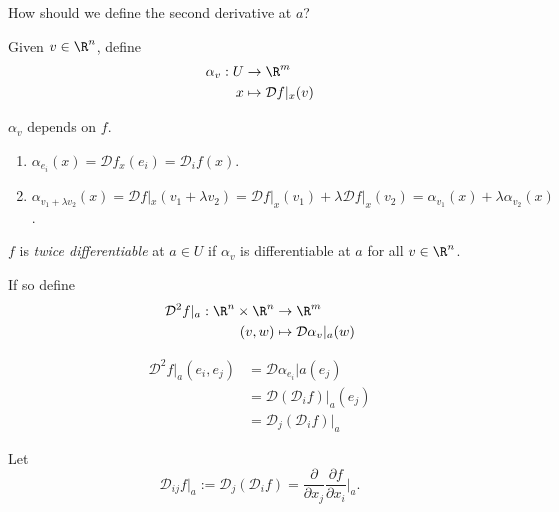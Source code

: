 \documentclass[a4paper]{article}
\newcommand*{\D}{\mathcal{D}}
\theoremstyle{definition}
\begin{document}
\begin{question}
  How should we define the second derivative at \(a\)?
\end{question}

Given \(v \in \R^n\), define
\begin{align*}
  \alpha_v: U &\to \R^m \\
  x &\mapsto \D f|_x(v)
\end{align*}

\begin{note}
  \(\alpha_v\) depends on \(f\).
\end{note}

\begin{eg}\leavevmode
  \begin{enumerate}
  \item \(\alpha_{e_i}(x) = \D f_{x}(e_i) =\D_i f(x)\).
  \item \(\alpha_{v_1 + \lambda v_2}(x) = \D f|_x(v_1 + \lambda v_2) = \D f|_x(v_1) + \lambda \D f|_x(v_2) = \alpha_{v_1}(x) + \lambda \alpha_{v_2}(x)\).
  \end{enumerate}
\end{eg}

\begin{definition}
  \(f\) is \emph{twice differentiable} at \(a \in U\) if \(\alpha_v\) is differentiable at \(a\) for all \(v \in \R^n\).

  If so define
  \begin{align*}
    \D^2 f|_a: \R^n \times \R^n &\to \R^m \\
    (v, w) &\mapsto \D \alpha_v|_a (w)
  \end{align*}
\end{definition}

\begin{eg}
  \begin{align*}
    \D^2 f|_a (e_i, e_j) &= \D \alpha_{e_i}|a (e_j) \\
                         &= \D (\D_i f)|_a (e_j) \\
                         &= \D_j (\D_i f)|_a
  \end{align*}
\end{eg}

\begin{notation}
  Let
  \[
    \D_{ij} f|_a := \D_j (\D_i f) = \frac{\partial}{\partial x_j} \frac{\partial f}{\partial x_i} \Big|_a.
  \]
\end{notation}
\end{document}
